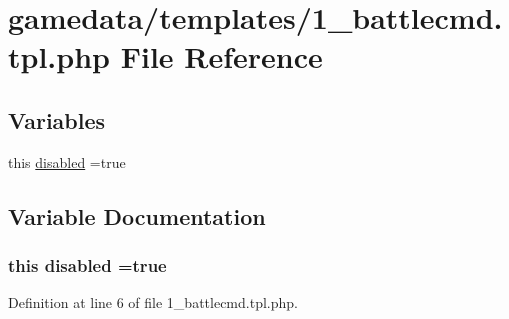 \hypertarget{1__battlecmd_8tpl_8php}{\section{gamedata/templates/1\+\_\+battlecmd.tpl.\+php File Reference}
\label{1__battlecmd_8tpl_8php}
}
\subsection*{Variables}
\begin{DoxyCompactItemize}
\item 
this \hyperlink{1__battlecmd_8tpl_8php_a5954796dd8b0e54067ec29be2f8c5cf3}{disabled} =true
\end{DoxyCompactItemize}


\subsection{Variable Documentation}
\hypertarget{1__battlecmd_8tpl_8php_a5954796dd8b0e54067ec29be2f8c5cf3}{
\subsubsection[{disabled}]{\setlength{\rightskip}{0pt plus 5cm}this disabled =true}}\label{1__battlecmd_8tpl_8php_a5954796dd8b0e54067ec29be2f8c5cf3}


Definition at line 6 of file 1\+\_\+battlecmd.\+tpl.\+php.

